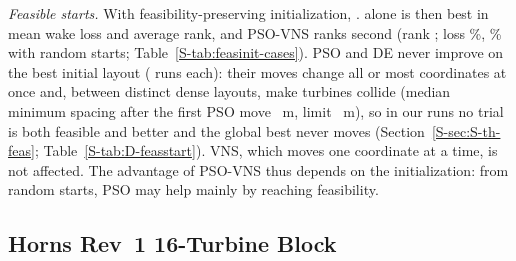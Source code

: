 \emph{Feasible starts.} With feasibility-preserving initialization, \NFeasInitPhrase. \NFbFeasBestRank{} alone is then best in mean wake loss and average rank, and PSO-VNS ranks second (rank \NFbFeasRankPSOVNS; loss \NFbFeasLossPSOVNS\%, \NFbRandLossPSOVNS\% with random starts; Table~\ref{S-tab:feasinit-cases}). PSO and DE never improve on the best initial layout (\NDFsStoredRunsPSO{} runs each): their moves change all or most coordinates at once and, between distinct dense layouts, make turbines collide (median minimum spacing after the first PSO move \NDFsFirstMinSpPSO~m, limit \NDSmin~m), so in our runs no trial is both feasible and better and the global best never moves (Section~\ref{S-sec:S-th-feas}; Table~\ref{S-tab:D-feasstart}). VNS, which moves one coordinate at a time, is not affected. The advantage of PSO-VNS thus depends on the initialization: from random starts, PSO may help mainly by reaching feasibility.

\subsection{Horns Rev~1 16-Turbine Block}
\label{sec:hornsrev-site}


